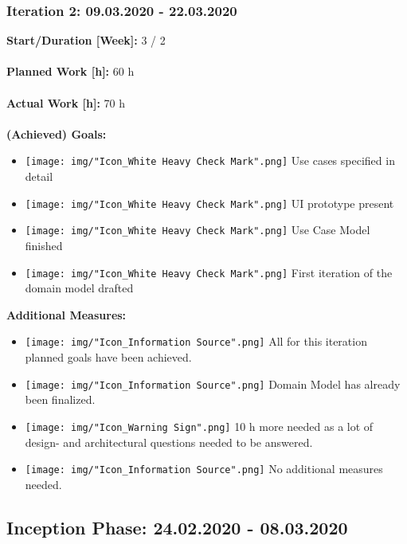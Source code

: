 			\subsubsection{Iteration 2: 09.03.2020 - 22.03.2020}
				\textbf{Start/Duration [Week]:} 3 / 2 \\~\\
				\textbf{Planned Work [h]:} 60 h \\~\\
				\textbf{Actual Work [h]:} 70 h \\~\\
				\textbf{(Achieved) Goals:}
				\begin{itemize}
					\item \texttt{[image: img/"Icon\_White Heavy Check Mark".png]} Use cases specified in detail
					\item \texttt{[image: img/"Icon\_White Heavy Check Mark".png]} UI prototype present
					\item \texttt{[image: img/"Icon\_White Heavy Check Mark".png]} Use Case Model finished
					\item \texttt{[image: img/"Icon\_White Heavy Check Mark".png]} First iteration of the domain model drafted
				\end{itemize}
				\textbf{Additional Measures:}
				\begin{itemize}
					\item \texttt{[image: img/"Icon\_Information Source".png]} All for this iteration planned goals have been achieved.
					\item \texttt{[image: img/"Icon\_Information Source".png]} Domain Model has already been finalized.
					\item \texttt{[image: img/"Icon\_Warning Sign".png]} 10 h more needed as a lot of design- and architectural questions needed to be answered.
					\item \texttt{[image: img/"Icon\_Information Source".png]} No additional measures needed.
				\end{itemize}

		\subsection{Inception Phase: 24.02.2020 - 08.03.2020}

